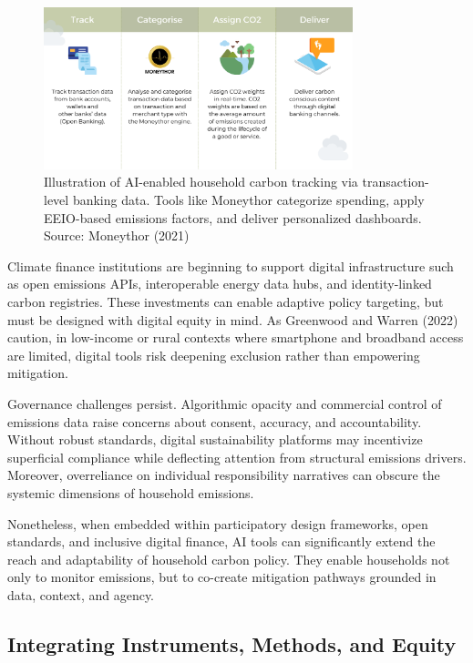 \documentclass[12pt,a4paper]{article}%
\begin{document}
\begin{figure}[htbp]
\centering
\includegraphics[width=0.8\textwidth]{moneythor.png} %
\caption{\small{Illustration of AI-enabled household carbon tracking via transaction-level banking data. Tools like Moneythor categorize spending, apply EEIO-based emissions factors, and deliver personalized dashboards. Source: Moneythor (2021)}}
\label{fig:carbontracker}
\end{figure}

Climate finance institutions are beginning to support digital infrastructure such as open emissions APIs, interoperable energy data hubs, and identity-linked carbon registries. These investments can enable adaptive policy targeting, but must be designed with digital equity in mind. As Greenwood and Warren (2022) caution, in low-income or rural contexts where smartphone and broadband access are limited, digital tools risk deepening exclusion rather than empowering mitigation.

Governance challenges persist. Algorithmic opacity and commercial control of emissions data raise concerns about consent, accuracy, and accountability. Without robust standards, digital sustainability platforms may incentivize superficial compliance while deflecting attention from structural emissions drivers. Moreover, overreliance on individual responsibility narratives can obscure the systemic dimensions of household emissions.

Nonetheless, when embedded within participatory design frameworks, open standards, and inclusive digital finance, AI tools can significantly extend the reach and adaptability of household carbon policy. They enable households not only to monitor emissions, but to co-create mitigation pathways grounded in data, context, and agency.

\subsection{Integrating Instruments, Methods, and Equity}
\end{document}
